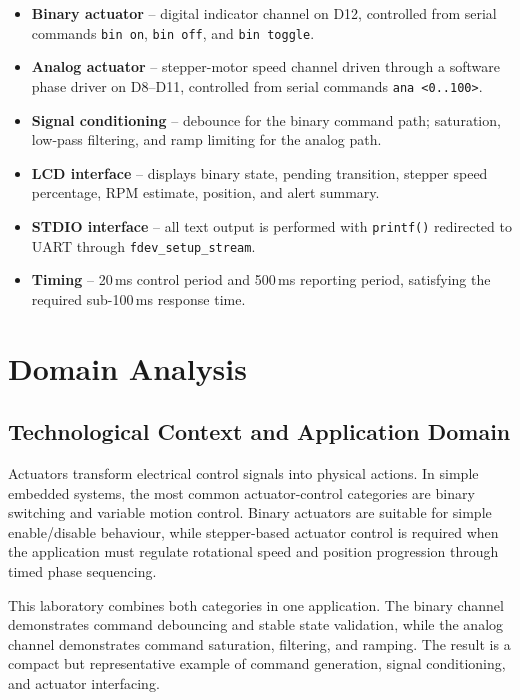 \documentclass[12pt]{article}
\begin{document}
\begin{itemize}
    \item \textbf{Binary actuator} -- digital indicator channel on D12, controlled from serial commands \texttt{bin on}, \texttt{bin off}, and \texttt{bin toggle}.
    \item \textbf{Analog actuator} -- stepper-motor speed channel driven through a software phase driver on D8--D11, controlled from serial commands \texttt{ana <0..100>}.
    \item \textbf{Signal conditioning} -- debounce for the binary command path; saturation, low-pass filtering, and ramp limiting for the analog path.
    \item \textbf{LCD interface} -- displays binary state, pending transition, stepper speed percentage, RPM estimate, position, and alert summary.
    \item \textbf{STDIO interface} -- all text output is performed with \texttt{printf()} redirected to UART through \texttt{fdev\_setup\_stream}.
    \item \textbf{Timing} -- 20\,ms control period and 500\,ms reporting period, satisfying the required sub-100\,ms response time.
\end{itemize}

\section{Domain Analysis}

\subsection{Technological Context and Application Domain}
\hspace{0.8cm} Actuators transform electrical control signals into physical actions. In simple embedded systems, the most common actuator-control categories are binary switching and variable motion control. Binary actuators are suitable for simple enable/disable behaviour, while stepper-based actuator control is required when the application must regulate rotational speed and position progression through timed phase sequencing.

This laboratory combines both categories in one application. The binary channel demonstrates command debouncing and stable state validation, while the analog channel demonstrates command saturation, filtering, and ramping. The result is a compact but representative example of command generation, signal conditioning, and actuator interfacing.
\end{document}
